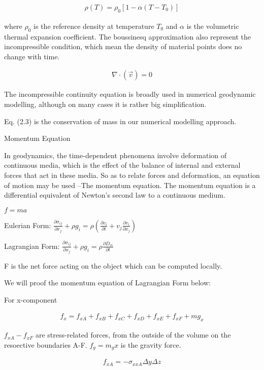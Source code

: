 \begin{align}
\rho (T) = \rho_0[1-\alpha (T-T_0)] 
\end{align}

where $\rho_0$ is the reference density at temperature $T_0$ and $\alpha$ is the volumetric thermal expansion coefficient. The boussinesq approximation also represent the incompressible condition, which mean the density of material points does no change with time. 

\begin{align}
\nabla \cdot (\vec v) = 0 
\end{align}

The incompressible continuity equation is broadly used in numerical geodynamic modelling, although on many cases it is rather big simplification. 


Eq. (2.3) is the conservation of mass in our numerical modelling approach.


Momentum Equation

In geodynamics, the time-dependent phenomena involve deformation of continuous media, which is the effect of the balance of internal and external forces that act in these media. So as to relate forces and deformation, an equation of motion may be used --The momentum equation. The momentum equation is a differential equivalent of Newton’s second law to a continuous medium.

$f=ma$

Eulerian Form: $\frac{\partial \sigma_{ij}}{\partial x_j}+\rho g_i = \rho (\frac{\partial v_i}{\partial t}+v_j\frac{\partial v_i}{\partial x_j})$

Lagrangian Form: $\frac{\partial \sigma_{ij}}{\partial x_j}+\rho g_i = \rho \frac{\partial D_{vi}}{\partial t}$

F is the net force acting on the object which can be computed locally. 

We will proof the momentum equation of Lagrangian Form below:

For x-component

\begin{align}
f_x=f_{xA}+f_{xB}+f_{xC}+f_{xD}+f_{xE}+f_{xF}+mg_x 
\end{align}

$f_{xA}- f_{xF}$ are stress-related forces, from the outside of the volume on the resoective boundaries A-F. 
$f_g=m_gx$ is the gravity force.

\begin{align}
f_{xA} = -\sigma_{xxA}\Delta y\Delta z
\end{align}


